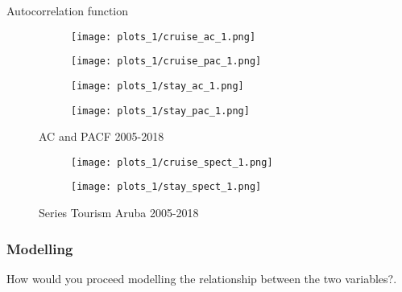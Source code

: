 \documentclass[11pt]{article}
\begin{document}
Autocorrelation function

\begin{figure}[H]
    \centering
    \begin{subfigure}[t]{0.45\textwidth}
         \texttt{[image: plots\_1/cruise\_ac\_1.png]}
    \end{subfigure}
    \begin{subfigure}[t]{0.45\textwidth}
          \texttt{[image: plots\_1/cruise\_pac\_1.png]}
    \end{subfigure}
    \begin{subfigure}[t]{0.45\textwidth}
         \texttt{[image: plots\_1/stay\_ac\_1.png]}
    \end{subfigure}
    \begin{subfigure}[t]{0.45\textwidth}
          \texttt{[image: plots\_1/stay\_pac\_1.png]}
    \end{subfigure}
    \caption{AC and PACF 2005-2018}
    \label{fig:autorro}
\end{figure}

\begin{figure}[H]
    \centering
    \begin{subfigure}[t]{0.45\textwidth}
         \texttt{[image: plots\_1/cruise\_spect\_1.png]}
    \end{subfigure}
    \begin{subfigure}[t]{0.45\textwidth}
          \texttt{[image: plots\_1/stay\_spect\_1.png]}
    \end{subfigure}
    \caption{Series Tourism Aruba 2005-2018}
    \label{fig:sepctral}
\end{figure}

\subsubsection{Modelling}
How would you proceed modelling the relationship between the two variables?. \\
\end{document}
